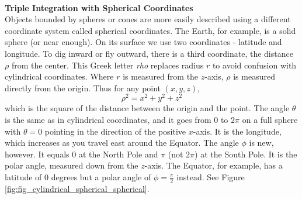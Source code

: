 \\


\noindent\textbf{\large Triple Integration with Spherical Coordinates}\\

Objects bounded by spheres or cones are more easily described using a different coordinate system called spherical coordinates.  The Earth, for example, is a solid sphere (or near enough). On its surface we use two coordinates - latitude and longitude. To dig inward or fly outward, there is a third coordinate, the distance $\rho$ from the center. This Greek letter \textit{rho} replaces radius $r$ to avoid confusion with cylindrical coordinates. Where $r$ is measured from the $z$-axis, $\rho$ is measured directly from the origin. Thus for any point $(x,y,z)$,
$$\rho^2 = x^2 + y^2 + z^2$$
which is the square of the distance between the origin and the point. The angle $\theta$ is the same as in cylindrical coordinates, and it goes from $0$ to $2\pi$ on a full sphere with $\theta = 0$ pointing in the direction of the positive $x$-axis. It is the longitude, which increases as you travel east around the Equator. The angle $\phi$ is new, however. It equals $0$ at the North Pole and $\pi$ (not $2\pi$) at the South Pole. It is the polar angle, measured down from the $z$-axis. The Equator, for example, has a latitude of $0$ degrees but a polar angle of $\phi = \frac{\pi}{2}$ instead. See Figure \ref{fig:fig_cylindrical_spherical_spherical}. 

